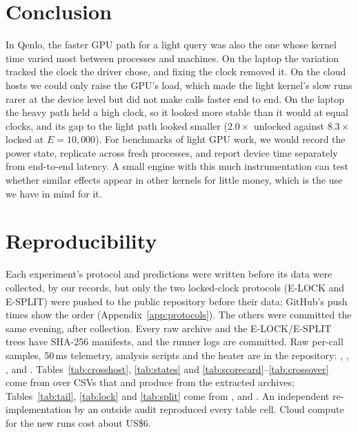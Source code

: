 \documentclass[10pt,twocolumn]{article}
\begin{document}
\section{Conclusion}\label{sec:conclusion}
In Qenlo, the faster GPU path for a light query was also the one whose kernel time varied most between processes and machines. On the laptop the variation tracked the clock the driver chose, and fixing the clock removed it. On the cloud hosts we could only raise the GPU's load, which made the light kernel's slow runs rarer at the device level but did not make calls faster end to end. On the laptop the heavy path held a high clock, so it looked more stable than it would at equal clocks, and its gap to the light path looked smaller ($2.0\times$ unlocked against $8.3\times$ locked at $E=10{,}000$). For benchmarks of light GPU work, we would record the power state, replicate across fresh processes, and report device time separately from end-to-end latency. A small engine with this much instrumentation can test whether similar effects appear in other kernels for little money, which is the use we have in mind for it.

\section*{Reproducibility}
Each experiment's protocol and predictions were written before its data were collected, by our records, but only the two locked-clock protocols (E-LOCK and E-SPLIT) were pushed to the public repository before their data; GitHub's push times show the order (Appendix~\ref{app:protocols}). The others were committed the same evening, after collection. Every raw archive and the E-LOCK/E-SPLIT trees have SHA-256 manifests, and the runner logs are committed. Raw per-call samples, 50\,ms telemetry, analysis scripts and the heater are in the repository: , , ,  and . Tables~\ref{tab:crosshost}, \ref{tab:states} and \ref{tab:scorecard}--\ref{tab:crossover} come from  over CSVs that  and  produce from the extracted archives; Tables~\ref{tab:tail}, \ref{tab:lock} and \ref{tab:split} come from ,  and . An independent re-implementation by an outside audit reproduced every table cell. Cloud compute for the new runs cost about US\$6.




\appendix

\end{document}

